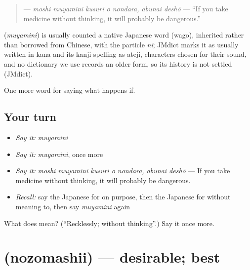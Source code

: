 \begin{quote}
\textbf{   } — \emph{moshi muyamini kusuri o nondara, abunai deshō} — \textquotedblleft{}If you take medicine without thinking, it will probably be dangerous.\textquotedblright{}
\end{quote}

\begin{cousinweb}
\textbf{} (\emph{muyamini}) is usually counted a native Japanese word (wago), inherited rather than borrowed from Chinese, with the particle \emph{ni}; JMdict marks it as usually written in kana and its kanji spelling as ateji, characters chosen for their sound, and no dictionary we use records an older form, so its history is not settled (JMdict).
\end{cousinweb}

\begin{grammarlens}[title={What you've built}]
One more word for saying what happens if.
\end{grammarlens}

\subsection*{Your turn}
\begin{itemize}
\raggedright
  \item \emph{Say it:} \emph{muyamini}
  \item \emph{Say it:} \emph{muyamini}, once more
  \item \emph{Say it:} \emph{moshi muyamini kusuri o nondara, abunai deshō} — If you take medicine without thinking, it will probably be dangerous.
  \item \emph{Recall:} say the Japanese for on purpose, then the Japanese for without meaning to, then say \emph{muyamini} again
\end{itemize}

\begin{tcolorbox}[breakable,colback=teal!4,colframe=teal!35!black,title={Before you move on}]
What does  mean? (\textquotedblleft{}Recklessly; without thinking\textquotedblright{}.) Say it once more.
\end{tcolorbox}
\section[\texorpdfstring{\ja{のぞましい} (nozomashii)}{のぞましい (nozomashii)}]{ (nozomashii) — desirable; best}

